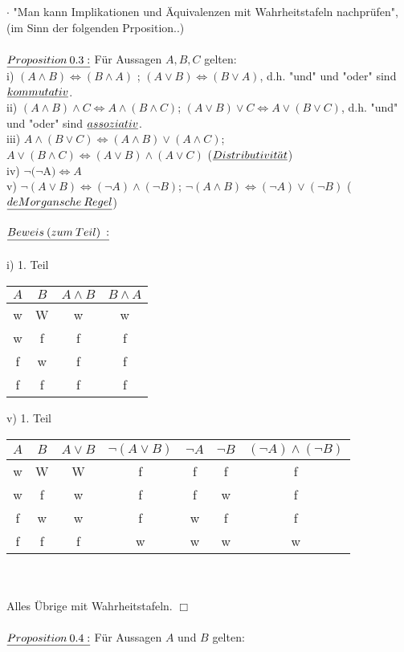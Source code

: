 \documentclass[fleqn, a4paper, 11pt]{article}
\begin{document}
	$\cdot$ "Man kann Implikationen und \"Aquivalenzen mit Wahrheitstafeln nachpr\"ufen", (im Sinn der folgenden Prposition..)\\
\\
$\uline{Proposition\:0.3:}$ F\"ur Aussagen $A,B,C$ gelten:\\
i) $(A\wedge B) \Leftrightarrow (B\wedge A)$ ; $(A\vee B) \Leftrightarrow (B\vee A)$, d.h. "und" und "oder" sind $\uline{kommutativ}$.\\
ii) $(A\wedge B)\wedge C \Leftrightarrow A\wedge (B\wedge C)$; $(A\vee B)\vee C\Leftrightarrow A\vee (B\vee C)$, d.h. "und" und "oder" sind $\uline{assoziativ}$.\\
iii) $A\wedge(B\vee C) \Leftrightarrow (A\wedge B)\vee(A\wedge C)$; $A\vee(B\wedge C) \Leftrightarrow (A\vee B)\wedge(A\vee C)$ ($\uline{Distributivit\ddot{a}t}$)\\
iv) $\neg(\neg$A$)\Leftrightarrow A$\\
v) $\neg(A\vee B)\Leftrightarrow (\neg A)\wedge (\neg B)$; $\neg(A\wedge B) \Leftrightarrow (\neg A)\vee (\neg B)$ ($\uline{deMorgansche\:Regel}$)\\
\\
$\uline{Beweis\:(zum\:Teil)\::}$\\
\\
i) 1. Teil \begin{tabular}{|c|c|c|c|}
	\hline
	$A$ & $B$ & $A\wedge B$ & $B\wedge A$ \\
	\hline
	w & W & w & w \\
	w & f & f & f \\
	f & w & f & f \\
	f & f & f & f \\
	\hline
\end{tabular}
v) 1. Teil \begin{tabular}{|c|c|c|c|c|c|c|}
	\hline
	$A$ & $B$ & $A\vee B$ & $\neg(A\vee B)$ & $\neg A$ & $\neg B$ & $(\neg A)\wedge(\neg B)$ \\
	\hline
	w & W & W & f & f & f & f \\
	w & f & w & f & f & w & f \\
	f & w & w & f & w & f & f \\
	f & f & f & w & w & w & w\\
	\hline
\end{tabular}\\
\\
Alles \"Ubrige mit Wahrheitstafeln. \hfill $\Box$\\
\\
$\uline{Proposition\:0.4:}$ F\"ur Aussagen $A$ und $B$ gelten:\\
\end{document}
